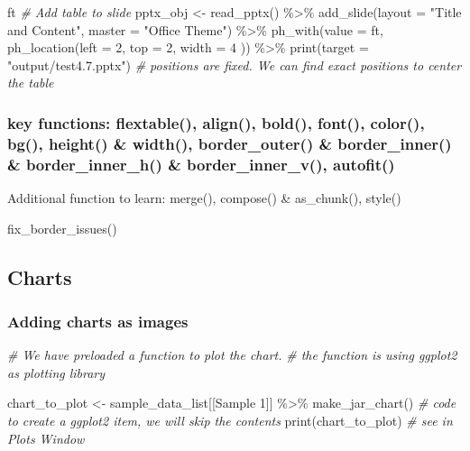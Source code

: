 \documentclass[
]{book}
\newenvironment{Shaded}{\begin{snugshade}}{\end{snugshade}}
\newcommand{\AttributeTok}[1]{\textcolor[rgb]{0.77,0.63,0.00}{#1}}
\newcommand{\CommentTok}[1]{\textcolor[rgb]{0.56,0.35,0.01}{\textit{#1}}}
\newcommand{\DecValTok}[1]{\textcolor[rgb]{0.00,0.00,0.81}{#1}}
\newcommand{\FunctionTok}[1]{\textcolor[rgb]{0.00,0.00,0.00}{#1}}
\newcommand{\NormalTok}[1]{#1}
\newcommand{\OtherTok}[1]{\textcolor[rgb]{0.56,0.35,0.01}{#1}}
\newcommand{\SpecialCharTok}[1]{\textcolor[rgb]{0.00,0.00,0.00}{#1}}
\newcommand{\StringTok}[1]{\textcolor[rgb]{0.31,0.60,0.02}{#1}}
\begin{document}
\begin{Shaded}
\begin{Highlighting}[]
\NormalTok{ft}
\CommentTok{\# Add table to slide}
\NormalTok{pptx\_obj }\OtherTok{\textless{}{-}} \FunctionTok{read\_pptx}\NormalTok{() }\SpecialCharTok{\%\textgreater{}\%}
  \FunctionTok{add\_slide}\NormalTok{(}\AttributeTok{layout =} \StringTok{"Title and Content"}\NormalTok{, }\AttributeTok{master =} \StringTok{"Office Theme"}\NormalTok{) }\SpecialCharTok{\%\textgreater{}\%}
  \FunctionTok{ph\_with}\NormalTok{(}\AttributeTok{value =}\NormalTok{ ft, }\FunctionTok{ph\_location}\NormalTok{(}\AttributeTok{left =} \DecValTok{2}\NormalTok{, }\AttributeTok{top =} \DecValTok{2}\NormalTok{, }\AttributeTok{width =} \DecValTok{4}\NormalTok{ )) }\SpecialCharTok{\%\textgreater{}\%} 
  \FunctionTok{print}\NormalTok{(}\AttributeTok{target =} \StringTok{"output/test4.7.pptx"}\NormalTok{) }
\CommentTok{\# positions are fixed. We can find exact positions to center the table}
\end{Highlighting}
\end{Shaded}

\hypertarget{key-functions-flextable-align-bold-font-color-bg-height-width-border_outer-border_inner-border_inner_h-border_inner_v-autofit}{%
\subsubsection{key functions: flextable(), align(), bold(), font(), color(), bg(), height() \& width(), border\_outer() \& border\_inner() \& border\_inner\_h() \& border\_inner\_v(), autofit()}\label{key-functions-flextable-align-bold-font-color-bg-height-width-border_outer-border_inner-border_inner_h-border_inner_v-autofit}}

Additional function to learn: merge(), compose() \& as\_chunk(), style()

fix\_border\_issues()

\hypertarget{charts}{%
\subsection{Charts}\label{charts}}

\hypertarget{adding-charts-as-images}{%
\subsubsection{Adding charts as images}\label{adding-charts-as-images}}

\begin{Shaded}
\begin{Highlighting}[]
\CommentTok{\# We have preloaded a function to plot the chart.}
\CommentTok{\# the function is using ggplot2 as plotting library}

\NormalTok{chart\_to\_plot }\OtherTok{\textless{}{-}}\NormalTok{ sample\_data\_list[[}\StringTok{\textquotesingle{}Sample 1\textquotesingle{}}\NormalTok{]] }\SpecialCharTok{\%\textgreater{}\%}
  \FunctionTok{make\_jar\_chart}\NormalTok{() }\CommentTok{\# code to create a ggplot2 item, we will skip the contents}
\FunctionTok{print}\NormalTok{(chart\_to\_plot) }\CommentTok{\# see in Plots Window}
\end{Highlighting}
\end{Shaded}
\end{document}
